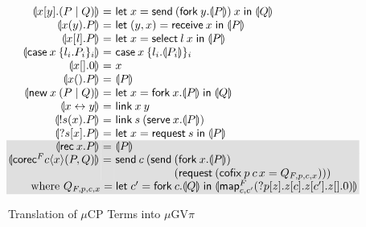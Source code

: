 \documentclass[orivec,envcountsame]{llncs}
\makeatletter
\newcommand{\mapname}{\mathsf{map}}
\newcommand{\map}[3]{\mapname^{#1}_{#2}(#3)}
\newcommand{\mkwd}[1]{\mathsf{#1}}
\newcommand{\link}[2]{#1 \leftrightarrow #2}
\newcommand{\cut}[4]{\mkwd{new}\:#1 \: (#3 \mid #4)}
\newcommand{\replicate}[2]{{!#1(#2)}}
\newcommand{\derelict}[2]{{?#1[#2]}}
\newcommand{\rec}[1]{\mkwd{rec}\:#1}
\newcommand{\corecf}[5]{\mkwd{corec}^{#1} #2 \langle #3 \rangle (#4,#5)}
\newcommand{\clabel}[1]{\mathit{#1}}
\renewcommand{\case}[2]{\mkwd{case}\:#1\:\{#2\}}
\newcommand{\sel}[2]{#1[\clabel{#2}]}
\newcommand{\gvsend}[2]{\mkwd{send}\:#1\:#2}
\newcommand{\gvreceive}[1]{\mkwd{receive}\:#1}
\newcommand{\gvlet}[3]{\mkwd{let}\;#1 = #2\;\mkwd{in}\;#3}
\newcommand{\gvselect}[2]{\mkwd{select}\:#1\:#2}
\newcommand{\gvcase}[2]{\mkwd{case}\:#1\:\{#2\}}
\newcommand{\gvlink}[2]{\mkwd{link}\:#1\:#2}
\newcommand{\gvfork}[2]{\mkwd{fork}\:#1.#2}
\newcommand{\lrkwd}{\mkwd{cofix}}
\newcommand{\gvfix}[3]{\lrkwd\:#1\:#2 = #3}
\newcommand{\gvserve}[2]{\mkwd{serve}\:#1.#2}
\newcommand{\gvrequest}[1]{\mkwd{request}\:#1}
\newcommand{\key}{\mkwd}
\newcommand{\togv}[1]{\llparenthesis #1 \rrparenthesis}
\newcommand{\mucp}{$\mu\mathrm{CP}$\xspace}
\newcommand{\gvpi}{$\mu\mathrm{GV}\pi$\xspace}
\newcommand{\ba}{\begin{array}}
\newcommand{\ea}{\end{array}}
\newcommand{\bl}{\ba[t]{@{}l@{}}}
\newcommand{\el}{\ea}
\newenvironment{equations}{\[\ba{@{}r@{~}c@{~}l@{}}}{\ea\]}
\newcommand\shaderow{\noalign{\vskip-0.4pt}\rowcolor{shade}[0.6mm]}
\makeatother
\begin{document}
\begin{figure}[float]
\vspace{-2mm}
\small
\begin{equations}
  \togv{x[y].(P \mid Q)} &=&
    \gvlet{x}{\gvsend{(\gvfork{y}{\togv{P}})}{x}}{\togv{Q}} \\
  \togv{x(y).P} &=&
    \gvlet{(y,x)}{\gvreceive{x}}{\togv{P}} \\
  \togv{\sel{x}{\mathit{l}}.P} &=&
    \gvlet{x}{\gvselect{l}{x}}{\togv{P}} \\
  \togv{\case{x}{l_i.P_i}_i} &=&
    \gvcase{x}{l_i.\togv{P_i}}_i \\
  \togv{x[].0} &=& x \\
  \togv{x().P} &=& \togv{P} \\
  \togv{\cut{x}{}{P}{Q}} &=&
    \gvlet{x}{\gvfork{x}{\togv{P}}}{\togv{Q}} \\
  \togv{\link{x}{y}} &=& \gvlink{x}{y} \\
  \togv{\replicate{s}{x}.P} &=&
    \gvlink{s}{(\gvserve{x}{\togv{P}})} \\
  \togv{\derelict{s}{x}.P} &=&
    \gvlet{x}{\gvrequest{s}}{\togv{P}} \\ \shaderow
  \togv{\rec{x}.P} &=& \togv{P} \\ \shaderow
  \togv{\corecf{F}{c}{x}{P}{Q}} &=&
    \key{send}\:c\:(
      \key{send}\:
         \bl
         (\gvfork{x}{\togv{P}}) \\
         (\gvrequest{(\gvfix{p}{c\,x}{Q_{F,p,c,x}})})) \\
         \el \\ \shaderow
\multicolumn{3}{@{}l@{}}
{\qquad\text{where }
  Q_{F,p,c,x} =
    \gvlet{c'}{\gvfork{c}{\togv{Q}}}
          {\togv{\map{F}{c,c'}{\derelict{p}{z}.z[c].z[c'].z[].0}}}}
\end{equations}%
\vspace{-2mm}
\caption{Translation of \mucp Terms into \gvpi}\label{fig:fromcp}
\end{figure}
\end{document}
